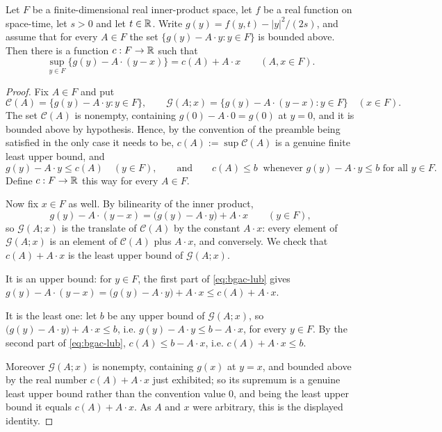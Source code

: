 \begin{lemma}
Let $F$ be a finite-dimensional real inner-product space, let $f$ be a real
function on space-time, let $s>0$ and let $t\in\mathbb{R}$. Write
$g(y)=f(y,t)-|y|^2/(2s)$, and assume that for every $A\in F$ the set
$\{g(y)-A\cdot y:y\in F\}$ is bounded above. Then there is a function
$c:F\to\mathbb{R}$ such that
\[
  \sup_{y\in F}\bigl\{g(y)-A\cdot(y-x)\bigr\}=c(A)+A\cdot x
  \qquad(A,x\in F).
\]
\end{lemma}
\begin{proof}
Fix $A\in F$ and put
\[
  \mathcal C(A)=\bigl\{g(y)-A\cdot y:y\in F\bigr\},
  \qquad
  \mathcal G(A;x)=\bigl\{g(y)-A\cdot(y-x):y\in F\bigr\}\quad(x\in F).
\]
The set $\mathcal C(A)$ is nonempty, containing $g(0)-A\cdot0=g(0)$ at $y=0$, and
it is bounded above by hypothesis. Hence, by the convention of the preamble
being satisfied in the only case it needs to be, $c(A):=\sup\mathcal C(A)$ is a
genuine finite least upper bound, and
\begin{equation}\label{eq:bgac-lub}
  g(y)-A\cdot y\le c(A)\quad(y\in F),
  \qquad\text{and}\qquad
  c(A)\le b\ \text{ whenever }g(y)-A\cdot y\le b\text{ for all }y\in F .
\end{equation}
Define $c:F\to\mathbb{R}$ this way for every $A\in F$.

Now fix $x\in F$ as well. By bilinearity of the inner product,
\[
  g(y)-A\cdot(y-x)=\bigl(g(y)-A\cdot y\bigr)+A\cdot x\qquad(y\in F),
\]
so $\mathcal G(A;x)$ is the translate of $\mathcal C(A)$ by the constant
$A\cdot x$: every element of $\mathcal G(A;x)$ is an element of $\mathcal C(A)$
plus $A\cdot x$, and conversely. We check that $c(A)+A\cdot x$ is the least upper
bound of $\mathcal G(A;x)$.

It is an upper bound: for $y\in F$, the first part of \eqref{eq:bgac-lub} gives
$g(y)-A\cdot(y-x)=\bigl(g(y)-A\cdot y\bigr)+A\cdot x\le c(A)+A\cdot x$.

It is the least one: let $b$ be any upper bound of $\mathcal G(A;x)$, so
$\bigl(g(y)-A\cdot y\bigr)+A\cdot x\le b$, i.e. $g(y)-A\cdot y\le b-A\cdot x$,
for every $y\in F$. By the second part of \eqref{eq:bgac-lub},
$c(A)\le b-A\cdot x$, i.e. $c(A)+A\cdot x\le b$.

Moreover $\mathcal G(A;x)$ is nonempty, containing $g(x)$ at $y=x$, and bounded
above by the real number $c(A)+A\cdot x$ just exhibited; so its supremum is a
genuine least upper bound rather than the convention value $0$, and being the
least upper bound it equals $c(A)+A\cdot x$. As $A$ and $x$ were arbitrary, this
is the displayed identity.
\end{proof}
